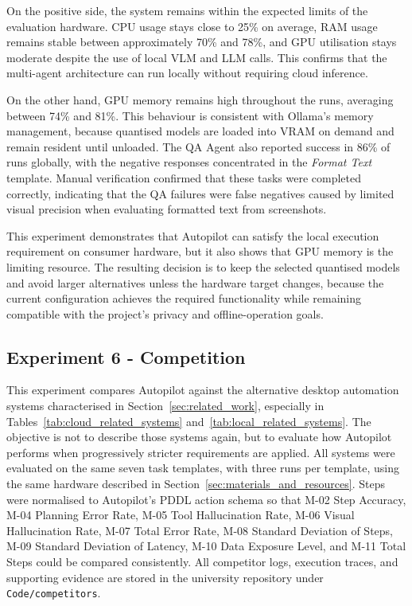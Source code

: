 On the positive side, the system remains within the expected limits of the evaluation hardware. CPU usage stays close to 25\% on average, RAM usage remains stable between approximately 70\% and 78\%, and GPU utilisation stays moderate despite the use of local VLM and LLM calls. This confirms that the multi-agent architecture can run locally without requiring cloud inference.

On the other hand, GPU memory remains high throughout the runs, averaging between 74\% and 81\%. This behaviour is consistent with Ollama's memory management, because quantised models are loaded into VRAM on demand and remain resident until unloaded. The QA Agent also reported success in 86\% of runs globally, with the negative responses concentrated in the \textit{Format Text} template. Manual verification confirmed that these tasks were completed correctly, indicating that the QA failures were false negatives caused by limited visual precision when evaluating formatted text from screenshots.

This experiment demonstrates that Autopilot can satisfy the local execution requirement on consumer hardware, but it also shows that GPU memory is the limiting resource. The resulting decision is to keep the selected quantised models and avoid larger alternatives unless the hardware target changes, because the current configuration achieves the required functionality while remaining compatible with the project's privacy and offline-operation goals.

\subsection{Experiment 6 - Competition}
\label{sec:competition_eval}

This experiment compares Autopilot against the alternative desktop automation systems characterised in Section~\ref{sec:related_work}, especially in Tables~\ref{tab:cloud_related_systems} and~\ref{tab:local_related_systems}. The objective is not to describe those systems again, but to evaluate how Autopilot performs when progressively stricter requirements are applied. All systems were evaluated on the same seven task templates, with three runs per template, using the same hardware described in Section~\ref{sec:materials_and_resources}. Steps were normalised to Autopilot's PDDL action schema so that M-02 Step Accuracy, M-04 Planning Error Rate, M-05 Tool Hallucination Rate, M-06 Visual Hallucination Rate, M-07 Total Error Rate, M-08 Standard Deviation of Steps, M-09 Standard Deviation of Latency, M-10 Data Exposure Level, and M-11 Total Steps could be compared consistently. All competitor logs, execution traces, and supporting evidence are stored in the university repository under \texttt{Code/competitors}.


